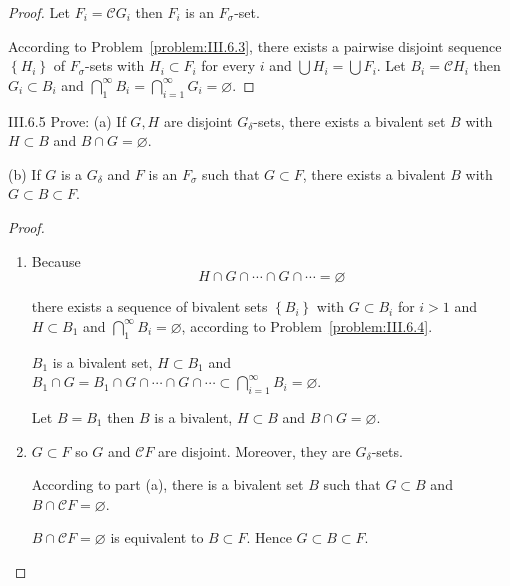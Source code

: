 \begin{proof}
	Let \( F_{i} = \mathscr{C}G_{i} \) then \( F_{i} \) is an \( F_{\sigma} \)-set.

	According to Problem~\ref{problem:III.6.3}, there exists a pairwise disjoint sequence \( \left\{ H_{i} \right\} \) of \(F_{\sigma}\)-sets with \(H_{i} \subset F_{i}\) for every \(i\) and \( \bigcup H_{i} = \bigcup F_{i} \). Let \( B_{i} = \mathscr{C}H_{i} \) then \( G_{i} \subset B_{i} \) and \( \bigcap^{\infty}_{1} B_{i} = \bigcap^{\infty}_{i=1} G_{i} = \varnothing \).
\end{proof}

\begin{problem}{III.6.5}
Prove: (a) If \(G, H\) are disjoint \(G_{\delta}\)-sets, there exists a bivalent set \(B\) with \(H \subset B\) and \( B \cap G = \varnothing \).

(b) If \(G\) is a \(G_{\delta}\) and \(F\) is an \(F_{\sigma}\) such that \(G \subset F\), there exists a bivalent \(B\) with \( G \subset B \subset F \).
\end{problem}

\begin{proof}
	\begin{enumerate}[label={(\alph*)}]
		\item Because
		      \[
			      H \cap G \cap \cdots \cap G \cap \cdots = \varnothing
		      \]

		      there exists a sequence of bivalent sets \( \left\{ B_{i} \right\} \) with \(G \subset B_{i}\) for \(i>1\) and \(H \subset B_{1}\) and \( \bigcap^{\infty}_{1} B_{i} = \varnothing \), according to Problem~\ref{problem:III.6.4}.

		      \(B_{1}\) is a bivalent set, \( H \subset B_{1} \) and \( B_{1} \cap G = B_{1} \cap G \cap \cdots \cap G \cap \cdots \subset \bigcap^{\infty}_{i=1} B_{i} = \varnothing \).

		      Let \( B = B_{1} \) then \(B\) is a bivalent, \( H \subset B \) and \( B \cap G = \varnothing \).
		\item \( G \subset F \) so \( G \) and \( \mathscr{C}F \) are disjoint. Moreover, they are \( G_{\delta} \)-sets.

		      According to part (a), there is a bivalent set \(B\) such that \( G \subset B \) and \( B \cap \mathscr{C}F = \varnothing \).

		      \( B \cap \mathscr{C}F = \varnothing \) is equivalent to \( B \subset F \). Hence \( G \subset B \subset F \).
	\end{enumerate}
\end{proof}

